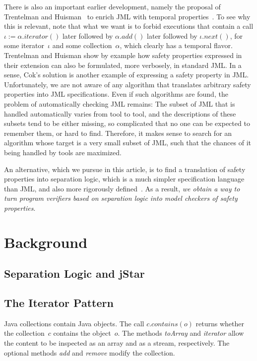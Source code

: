 \documentclass[a4paper]{article}
\theoremstyle{slanted}
\theoremstyle{definition}
\theoremstyle{remark}
\begin{document}
There is also an important earlier development, namely the proposal of Trentelman and Huisman~\cite{trentelman2002} to enrich JML with temporal properties~\cite{pnueli1977}.
To see why this is relevant, note that what we want is to forbid executions that contain a call $\iota:=\alpha.\mathit{iterator}()$ later followed by $\alpha.\mathit{add}()$ later followed by $\iota.\mathit{next}()$, for some iterator~$\iota$ and some collection~$\alpha$, which clearly has a temporal flavor.
Trentelman and Huisman show by example how safety properties expressed in their extension can also be formulated, more verbosely, in standard JML\null.
In a sense, Cok's solution is another example of expressing a safety property in JML\null.
Unfortunately, we are not aware of any algorithm that translates arbitrary safety properties into JML specifications.
Even if such algorithms are found, the problem of automatically checking JML remains:
The subset of JML that is handled automatically varies from tool to tool, and the descriptions of these subsets tend to be either missing, so complicated that no one can be expected to remember them, or hard to find.
Therefore, it makes sense to search for an algorithm whose target is a very small subset of JML, such that the chances of it being handled by tools are maximized.

An alternative, which we pursue in this article, is to find a translation of safety properties into separation logic, which is a much simpler specification language than JML, and also more rigorously defined~\cite{reynolds2002}. 
As a result, \emph{we obtain a way to turn program verifiers based on separation logic into model checkers of safety properties}.

\section{Background}

\subsection{Separation Logic and jStar}
\subsection{The Iterator Pattern}


Java collections contain Java objects.
The call $c.\mathit{contains}(o)$ returns whether the collection~$c$ contains the object~$o$.
The methods \textit{toArray} and \textit{iterator} allow the content to be inspected as an array and as a stream, respectively.
The optional methods \textit{add} and \textit{remove} modify the collection.
\end{document}
